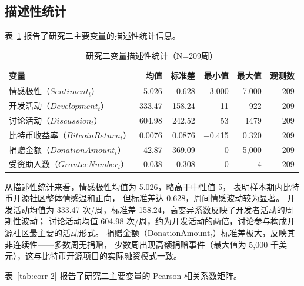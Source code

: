\subsection{描述性统计}

表~\ref{tab:desc-stats-2} 报告了研究二主要变量的描述性统计信息。

\begin{table}[htbp]
    \centering
    \small
    \caption{研究二变量描述性统计（N=209周）}
    \label{tab:desc-stats-2}
    \begin{tabularx}{\textwidth}{Xrrrrr}
        \toprule
        变量 & 均值 & 标准差 & 最小值 & 最大值 & 观测数 \\
        \midrule
        情感极性（$Sentiment_t$） & 5.026 & 0.628 & 3.000 & 7.000 & 209 \\
        开发活动（$Development_t$）      & 333.47 & 158.24 & 11 & 922 & 209 \\
        讨论活动（$Discussion_t$）   & 604.98 & 242.52 & 53 & 1479 & 209 \\
        比特币收益率（$BitcoinReturn_t$）    & 0.0076 & 0.0876 & $-$0.415 & 0.320 & 209 \\
        捐赠金额（$DonationAmount_t$）  & 42.87 & 369.09 & 0 & 5{,}000 & 209 \\
        受资助人数（$GranteeNumber_t$）     & 0.038 & 0.308 & 0 & 4 & 209 \\
        \bottomrule
    \end{tabularx}
\end{table}

从描述性统计来看，情感极性均值为 5.026，略高于中性值 5，
表明样本期内比特币开源社区整体情感温和正向，
但标准差达 0.628，周间情感波动较为显著。
开发活动均值为 333.47 次/周，标准差 158.24，高变异系数反映了开发者活动的周期性波动；
讨论活动均值 604.98 次/周，约为开发活动的两倍，讨论参与构成开源社区最主要的活动形式。
捐赠金额（$\text{DonationAmount}_t$）标准差极大，反映其非连续性——多数周无捐赠，
少数周出现高额捐赠事件（最大值为 5,000 千美元），这与比特币开源项目的实际融资模式一致。

表~\ref{tab:corr-2} 报告了研究二主要变量的 Pearson 相关系数矩阵。

